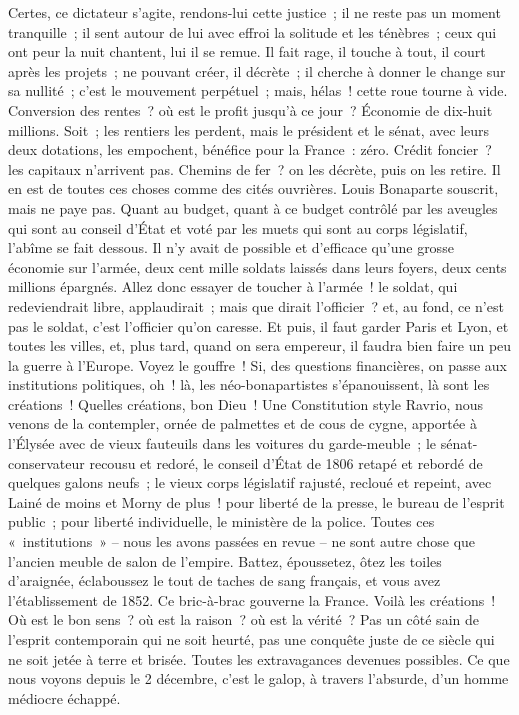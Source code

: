\documentclass[french,twoside]{book} %
\begin{document}
Certes, ce dictateur s’agite, rendons-lui cette justice ; il ne reste pas un moment tranquille ; il sent autour de lui avec effroi la solitude et les ténèbres ; ceux qui ont peur la nuit chantent, lui il se remue. Il fait rage, il touche à tout, il court après les projets ; ne pouvant créer, il décrète ; il cherche à donner le change sur sa nullité ; c’est le mouvement perpétuel ; mais, hélas ! cette roue tourne à vide. Conversion des rentes ? où est le profit jusqu’à ce jour ? Économie de dix-huit millions. Soit ; les rentiers les perdent, mais le président et le sénat, avec leurs deux dotations, les empochent, bénéfice pour la France : zéro. Crédit foncier ? les capitaux n’arrivent pas. Chemins de fer ? on les décrète, puis on les retire. Il en est de toutes ces choses comme des cités ouvrières. Louis Bonaparte souscrit, mais ne paye pas. Quant au budget, quant à ce budget contrôlé par les aveugles qui sont au conseil d’État et voté par les muets qui sont au corps législatif, l’abîme se fait dessous. Il n’y avait de possible et d’efficace qu’une grosse économie sur l’armée, deux cent mille soldats laissés dans leurs foyers, deux cents millions épargnés. Allez donc essayer de toucher à l’armée ! le soldat, qui redeviendrait libre, applaudirait ; mais que dirait l’officier ? et, au fond, ce n’est pas le soldat, c’est l’officier qu’on caresse. Et puis, il faut garder Paris et Lyon, et toutes les villes, et, plus tard, quand on sera empereur, il faudra bien faire un peu la guerre à l’Europe. Voyez le gouffre ! Si, des questions financières, on passe aux institutions politiques, oh ! là, les néo-bonapartistes s’épanouissent, là sont les créations ! Quelles créations, bon Dieu ! Une Constitution style Ravrio, nous venons de la contempler, ornée de palmettes et de cous de cygne, apportée à l’Élysée avec de vieux fauteuils dans les voitures du garde-meuble ; le sénat-conservateur recousu et redoré, le conseil d’État de 1806 retapé et rebordé de quelques galons neufs ; le vieux corps législatif rajusté, recloué et repeint, avec Lainé de moins et Morny de plus ! pour liberté de la presse, le bureau de l’esprit public ; pour liberté individuelle, le ministère de la police. Toutes ces « institutions » – nous les avons passées en revue – ne sont autre chose que l’ancien meuble de salon de l’empire. Battez, époussetez, ôtez les toiles d’araignée, éclaboussez le tout de taches de sang français, et vous avez l’établissement de 1852. Ce bric-à-brac gouverne la France. Voilà les créations ! Où est le bon sens ? où est la raison ? où est la vérité ? Pas un côté sain de l’esprit contemporain qui ne soit heurté, pas une conquête juste de ce siècle qui ne soit jetée à terre et brisée. Toutes les extravagances devenues possibles. Ce que nous voyons depuis le 2 décembre, c’est le galop, à travers l’absurde, d’un homme médiocre échappé.\par
\end{document}
